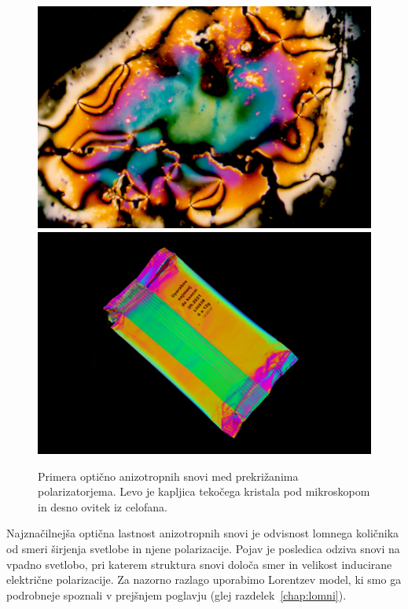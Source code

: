 \begin{figure}[ht]
\centering
\includegraphics[width=7truecm]{slike/10_foto_nematik.jpg}\hfill
\includegraphics[width=7truecm]{slike/10_foto_celofan.jpg}
\caption{Primera optično anizotropnih snovi med prekrižanima polarizatorjema.
Levo je kapljica tekočega kristala pod mikroskopom in desno 
ovitek iz celofana.}
\label{fig:10_nematik}
\end{figure}

Najznačilnejša optična lastnost anizotropnih snovi je odvisnost lomnega
količnika od smeri širjenja svetlobe in njene polarizacije. Pojav
je posledica odziva snovi na vpadno svetlobo, pri katerem struktura snovi
določa smer in velikost inducirane električne polarizacije.  
Za nazorno razlago uporabimo Lorentzev model, ki smo ga podrobneje spoznali v prejšnjem 
poglavju (glej razdelek~\ref{chap:lomni}). 

